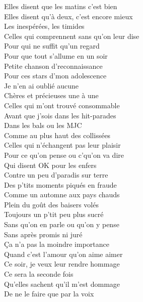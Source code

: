 \documentclass{novel}
\begin{document}
{\begin{minipage}[t][0.55\textheight][t]{\textwidth}
\begin{multicols}{2}
Elles disent que les matins c'est bien \\
Elles disent qu'à deux, c'est encore mieux \\
Les inespérées, les timides \\
Celles qui comprennent sans qu'on leur dise \\
Pour qui ne suffit qu'un regard \\
Pour que tout s'allume en un soir \\

Petite chanson d'reconnaissance \\
Pour ces stars d'mon adolescence \\
Je n'en ai oublié aucune \\
Chères et précieuses une à une \\

Celles qui m'ont trouvé consommable \\
Avant que j'sois dans les hit-parades \\
Dans les bals ou les MJC \\
Comme au plus haut des collissées \\
Celles qui n'échangent pas leur plaisir \\
Pour ce qu'on pense ou c'qu'on va dire \\
Qui disent OK pour les enfers \\
Contre un peu d'paradis sur terre \\
Des p'tits moments piqués en fraude \\

Comme un automne aux pays chauds \\
Plein du goût des baisers volés \\
Toujours un p'tit peu plus sucré \\
Sans qu'on en parle ou qu'on y pense \\
Sans après promis ni juré \\
Ça n'a pas la moindre importance \\
Quand c'est l'amour qu'on aime aimer \\

Ce soir, je veux leur rendre hommage \\
Ce sera la seconde fois \\
Qu'elles sachent qu'il m'est dommage \\
De ne le faire que par la voix
\end{multicols}
\end{minipage}
}
\end{document}
